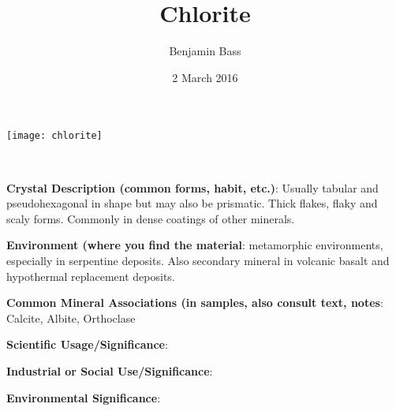 \documentclass[10pt]{article}
\author{Benjamin Bass}
\date{2 March 2016}
\title{\vspace{-2.0cm}Chlorite} %
\begin{document}
\maketitle


\begin{center}
  \texttt{[image: chlorite]}
\end{center}



\
\
\
\
\
\
\
\
\
\

\begin{framed}
  \textbf{Crystal Description (common forms, habit, etc.)}: Usually tabular and pseudohexagonal in shape but may also be prismatic. Thick flakes, flaky and scaly forms. Commonly in dense coatings of other minerals.
\end{framed}

\begin{framed}
  \textbf{Environment (where you find the material}: metamorphic environments, especially in serpentine deposits. Also secondary mineral in volcanic basalt and hypothermal replacement deposits.
\end{framed}

\begin{framed}
  \textbf{Common Mineral Associations (in samples, also consult text, notes}: Calcite, Albite, Orthoclase
\end{framed}

\begin{framed}
  \textbf{Scientific Usage/Significance}: 
\end{framed}

\begin{framed}
  \textbf{Industrial or Social Use/Significance}: 
\end{framed}

\begin{framed}
  \textbf{Environmental Significance}: 
\end{framed}

\end{document}
